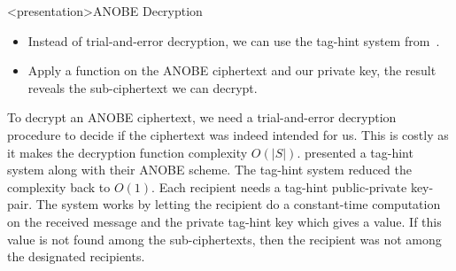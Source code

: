 \begin{frame}
  \begin{figure}
    \begin{algorithmic}[1]
        \pause{}

          \State{%
            \Return{$\bot$}
          }
        \EndIf{}

        \pause{}

            \State{\Return{$\bot$}}
          \EndIf{}
        \EndFor{}
        \State{\Return{$\bot$}}
      \EndFunction{}
    \end{algorithmic}
  \end{figure}
\end{frame}

\begin{frame}<presentation>{ANOBE Decryption}
  \begin{itemize}
    \item Instead of trial-and-error decryption, we can use the tag-hint system 
      from~\cite{ANOBE}.

    \item Apply a function on the \ac{ANOBE} ciphertext and our private key, 
      the result reveals the sub-ciphertext we can decrypt.

  \end{itemize}
\end{frame}

To decrypt an \ac{ANOBE} ciphertext, we need a trial-and-error decryption 
procedure to decide if the ciphertext was indeed intended for us.
This is costly as it makes the decryption function complexity \(O(|S|)\).
\citet{ANOBE} presented a tag-hint system along with their \ac{ANOBE} scheme.
The tag-hint system reduced the complexity back to \(O(1)\).
Each recipient needs a tag-hint public-private key-pair.
The system works by letting the recipient do a constant-time computation on the 
received message and the private tag-hint key which gives a value.
If this value is not found among the sub-ciphertexts, then the recipient was 
not among the designated recipients.

